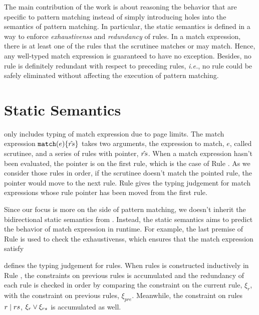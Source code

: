 \documentclass[acmsmall,screen,review,nonacm]{acmart}
\theoremstyle{slplain}
\numberwithin{thm}{section}
\begin{document}
The main contribution of the work is about reasoning the behavior that are specific to pattern matching instead of simply introducing holes into the semantics of pattern matching. In particular, the static semantics is defined in a way to enforce \emph{exhaustivenss} and \emph{redundancy} of rules. In a match expression, there is at least one of the rules that the scrutinee matches or may match. Hence, any well-typed match expression is guaranteed to have no exception. Besides, no rule is definitely redundant with respect to preceding rules, \textit{i.e.}, no rule could be safely eliminated without affecting the execution of pattern matching.

\section{Static Semantics}
\label{sec:statics}



 only includes typing of match expression due to page limits. The match expression $\mathtt{match}(e) \{\hat{rs}\}$ takes two arguments, the expression to match, $e$, called scrutinee, and a series of rules with pointer, $\hat{rs}$. When a match expression hasn't been evaluated, the pointer is on the first rule, which is the case of Rule \TMatchZPre. As we consider those rules in order, if the scrutinee doesn't match the pointed rule, the pointer would move to the next rule. Rule \TMatchNZPre gives the typing judgement for match expressions whose rule pointer has been moved from the first rule.

Since our focus is more on the side of pattern matching, we doesn't inherit the bidirectional static semantics from \citet{DBLP:conf/popl/OmarVHAH17}. Instead, the static semantics aims to predict the behavior of match expression in runtime. For example, the last premise of Rule \TMatchZPre is used to check the exhaustivenss, which ensures that the match expression satisfy 



 defines the typing judgement for rules. When rules is constructed inductively in Rule \TRules, the constraints on previous rules is accumulated and the redundancy of each rule is checked in order by comparing the constraint on the current rule, $\xi_r$, with the constraint on previous rules, $\xi_{pre}$. Meanwhile, the constraint on rules $r \mid rs$, $\xi_r \vee \xi_{rs}$ is accumulated as well.
\end{document}
